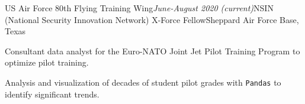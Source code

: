 \begin{rSubsection}{US Air Force 80th Flying Training Wing}{\em June-August 2020 (current)}{NSIN (National Security Innovation Network) X-Force Fellow}{Sheppard Air Force Base, Texas}
\item Consultant data analyst for the Euro-NATO Joint Jet Pilot Training Program to optimize pilot training.
\item Analysis and visualization of decades of student pilot grades with \texttt{Pandas} to identify significant trends.
\end{rSubsection}